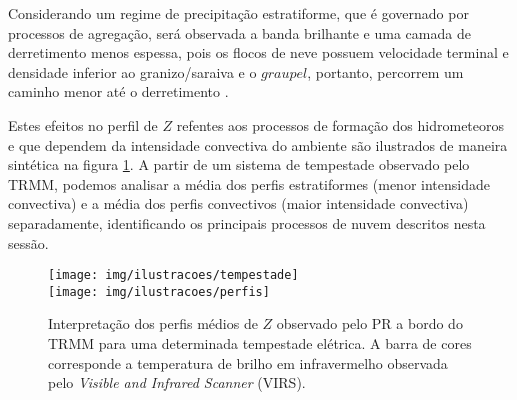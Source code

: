 Considerando um regime de precipitação estratiforme, que é governado por processos de agregação, será observada a banda brilhante e uma camada de derretimento menos espessa, pois os flocos de neve possuem velocidade terminal e densidade inferior  ao granizo/saraiva e o $graupel$, portanto, percorrem um caminho menor até o derretimento \cite{Fabry1995}. 

Estes efeitos no perfil de $Z$ refentes aos processos de formação dos hidrometeoros e que dependem da intensidade convectiva do ambiente são ilustrados de maneira sintética na figura \ref{convestraDerr}. A partir de um sistema de tempestade observado pelo TRMM, podemos analisar a média dos perfis estratiformes (menor intensidade convectiva) e a média dos perfis convectivos (maior intensidade convectiva) separadamente, identificando os principais processos de nuvem descritos nesta sessão.

\newpage
\begin{figure}[htb]
\centering
\texttt{[image: img/ilustracoes/tempestade]}\\
\texttt{[image: img/ilustracoes/perfis]}
\caption{Interpretação dos perfis médios de $Z$ observado pelo PR a bordo do TRMM para uma determinada tempestade elétrica. A barra de cores corresponde a temperatura de brilho em infravermelho observada pelo \textit{Visible and Infrared Scanner} (VIRS).}
\label{convestraDerr}
\end{figure}




